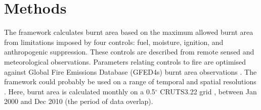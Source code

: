 \section{Methods}
The framework calculates burnt area based on the maximum allowed burnt area from limitations imposed by four controls: fuel, moisture, ignition, and anthropogenic suppression. These controls are described from remote sensed and meteorological observations. Parameters relating controls to fire are optimised against Global Fire Emissions Database (GFED4s) burnt area observations \citep{Giglio2013}.
The framework could probably be used on a range of temporal and spatial resolutions
.
Here, burnt area is calculated monthly on a 0.5$^{\circ}$ CRUTS3.22 grid \citep{harris2014cru}, between Jan 2000 and Dec 2010 (the period of data overlap).




